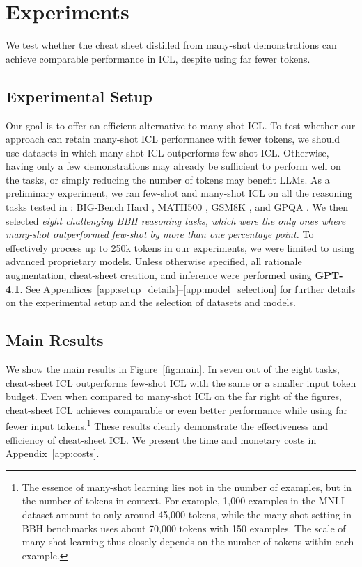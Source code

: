\documentclass[11pt]{article}
\begin{document}
\section{Experiments}
\label{sec:experiments}

We test whether the cheat sheet distilled from many-shot demonstrations can achieve comparable performance in ICL, despite using far fewer tokens.


\subsection{Experimental Setup}
\label{sec:setup}

Our goal is to offer an efficient alternative to many-shot ICL.
To test whether our approach can retain many-shot ICL performance with fewer tokens, we should use datasets in which many-shot ICL outperforms few-shot ICL.
Otherwise, having only a few demonstrations may already be sufficient to perform well on the tasks, or simply reducing the number of tokens may benefit LLMs.
As a preliminary experiment, we ran few-shot and many-shot ICL on all the reasoning tasks tested in \citet{agarwal2024manyshot}: BIG-Bench Hard \citep[\textbf{BBH};][]{suzgun-etal-2023-challenging,srivastava2023beyond}, MATH500 \citep{lightman2024lets}, GSM8K \citep{cobbe2021training}, and GPQA \citep{rein2024gpqa}.
We then selected \emph{eight challenging BBH reasoning tasks, which were the only ones where many-shot outperformed few-shot by more than one percentage point.}
To effectively process up to 250k tokens in our experiments, we were limited to using advanced proprietary models.
Unless otherwise specified, all rationale augmentation, cheat-sheet creation, and inference were performed using \textbf{GPT-4.1}.
See Appendices~\ref{app:setup_details}--\ref{app:model_selection} for further details on the experimental setup and the selection of datasets and models.


\subsection{Main Results}
\label{sec:main_results}
We show the main results in Figure~\ref{fig:main}.
In seven out of the eight tasks, cheat-sheet ICL outperforms few-shot ICL with the same or a smaller input token budget.
Even when compared to many-shot ICL on the far right of the figures, cheat-sheet ICL achieves comparable or even better performance while using far fewer input tokens.\footnote{
The essence of many-shot learning lies not in the number of examples, but in the number of tokens in context.
For example, 1,000 examples in the MNLI dataset amount to only around 45,000 tokens, while the many-shot setting in BBH benchmarks uses about 70,000 tokens with 150 examples.
The scale of many-shot learning thus closely depends on the number of tokens within each example.
}
These results clearly demonstrate the effectiveness and efficiency of cheat-sheet ICL.
We present the time and monetary costs in Appendix~\ref{app:costs}.
\end{document}
